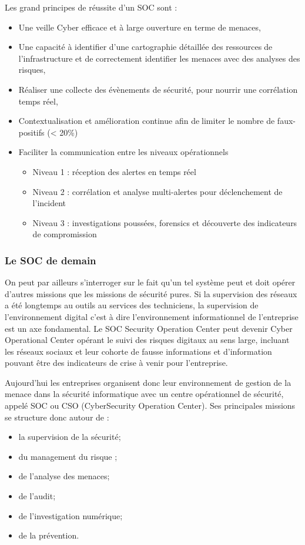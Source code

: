 Les grand principes de réussite d’un SOC sont : 
\begin{itemize}
  \item Une veille Cyber efficace et à large ouverture en terme de menaces,
  \item Une capacité à identifier d’une cartographie détaillée des ressourcesde l’infrastructure et de correctement identifier les menaces avec des analyses des risques,
  \item Réaliser une collecte des évènements de sécurité, pour nourrir une corrélation temps réel,
  \item Contextualisation et amélioration continue afin delimiter le nombre de faux-positifs (< 20\%)
  \item Faciliter la communication entre les niveaux opérationnels
		\begin{itemize}
  				\item Niveau 1 : réception des alertes en temps réel
				\item Niveau 2 : corrélation et analyse multi-alertes pour déclenchement de l’incident
				\item Niveau 3 : investigations poussées, forensics et découverte des indicateurs de compromission
			\end{itemize}
\end{itemize}




\subsubsection{Le SOC de demain}
On peut par ailleurs s'interroger sur le fait qu'un tel système peut et doit opérer d'autres missions que les missions de sécurité pures. Si la supervision des réseaux a été longtemps au outils au services des techniciens, la supervision de l'environnement digital c'est à dire l'environnement informationnel de l'entreprise est un axe fondamental. Le SOC Security Operation Center peut devenir Cyber Operational Center opérant le suivi des risques digitaux au sens large, incluant les réseaux sociaux et leur cohorte de fausse informations et d'information pouvant être des indicateurs de crise à venir pour l'entreprise.

Aujourd’hui les entreprises organisent donc leur environnement de gestion de la menace dans la sécurité informatique avec un centre opérationnel de sécurité, appelé SOC ou CSO (CyberSecurity Operation Center). Ses principales missions se structure donc autour de  : 
\begin{itemize}
  \item la supervision de la sécurité;
  \item du management du risque ;
  \item de l’analyse des menaces;
  \item de l’audit;
  \item de l’investigation numérique;
  \item de la prévention.
\end{itemize}

